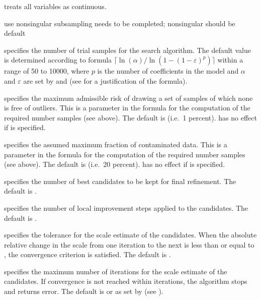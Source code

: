 \hangpara
     treats all variables as continuous.

\hangpara
     use nonsingular subsampling \alert{needs to be completed; 
    nonsingular should be default}

\hangpara
     specifies the number of trial samples for the search
    algorithm. The default value is determined according to formula
    $
    \lceil \ln(\alpha) / \ln(1 - (1 - \varepsilon)^p) \rceil
    $
    within a range of 50 to 10000, where $p$ is the number of coefficients in
    the model and $\alpha$ and $\varepsilon$ are set by  and
     (see \citealp{salibian:yohai:2006} for a justification of
    the formula).

\hangpara
     specifies the maximum admissible risk of drawing a set
    of samples of which none is free of outliers. This is a parameter in the
    formula for the computation of the required number samples (see above). The
    default is  (i.e.\ 1 percent).  has no
    effect if  is specified.

\hangpara
     specifies the assumed maximum fraction of
    contaminated data. This is a parameter in the formula for the computation
    of the required number samples (see above). The default is
     (i.e.\ 20 percent).  has no effect if
     is specified.

\hangpara
     specifies the number of best candidates to be
    kept for final refinement. The default is .

\hangpara
     specifies the number of local improvement steps
    applied to the candidates. The default is .

\hangpara
     specifies the tolerance for the scale estimate of
    the candidates. When the absolute relative change in the scale from one
    iteration to the next is less than or equal to , the
    convergence criterion is satisfied. The default is .

\hangpara
     specifies the maximum number of iterations for the
    scale estimate of the candidates. If convergence is not reached within
     iterations, the algorithm stops and returns error. The
    default is  or as set by  (see
    ).

